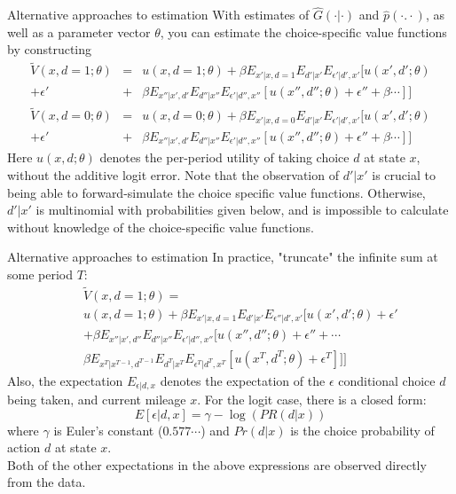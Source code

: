 \documentclass[xcolor=pdftex,dvipsnames,table,mathserif]{beamer}
\begin{document}
\begin{frame}{Alternative approaches to estimation}
With estimates of $\hat G (\cdot | \cdot)$ and $\hat p (\cdot .  \cdot)$, as well as a parameter vector $\theta$, you can \alert{estimate} the choice-specific value functions by constructing  
\begin{eqnarray*}
\tilde V(x, d =1 ;\theta) &= & u(x, d=1; \theta) + \beta E_{x'|x, d=1} E_{d'|x'} E_{\epsilon '| d', x'} [ u(x', d' ;\theta)\\ 
+ \epsilon' &+&  \beta E_{x''|x', d'} E_{d''|x''} E_{\epsilon'|d'', x''} [ u(x'', d'';\theta) + \epsilon'' + \beta \cdots ] ] \\
\tilde V(x, d =0 ;\theta) &= & u(x, d=0; \theta) + \beta E_{x'|x, d=0} E_{d'|x'} E_{\epsilon '| d', x'} [ u(x', d' ;\theta)  \\
+ \epsilon' &+& \beta E_{x''|x', d'} E_{d''|x''} E_{\epsilon'|d'', x''} [ u(x'', d'';\theta) + \epsilon'' + \beta \cdots ] ]
\end{eqnarray*}
Here $u(x, d;\theta)$ denotes the per-period utility of taking choice $d$ at state $x$, \alert{without} the additive logit error. Note that the observation of $d'|x'$ is crucial to being able to forward-simulate the \alert{choice specific value functions}. Otherwise, $d'|x'$ is multinomial with probabilities given below, and is impossible to calculate without knowledge of the choice-specific value functions. 
\end{frame}


\begin{frame}{Alternative approaches to estimation}
In practice, "truncate" the infinite sum at some period $T$: 
\begin{eqnarray*} 
&& \tilde V(x, d=1;\theta) =\\
&& u(x, d=1; \theta) + \beta E_{x'|x, d=1} E_{d'|x'} E_{\epsilon''|d', x'} [u(x', d';\theta) + \epsilon' \\
&& + \beta E_{x''|x', d''} E_{d''|x''} E_{\epsilon'|d'', x''} [u(x'', d'';\theta) + \epsilon'' + \cdots \\
&& \beta E_{x^T|x^{T-1}, d^{T-1}} E_{d^T|x^T} E_{\epsilon^T|d^T, x^T} [u(x^T, d^T;\theta) + \epsilon^T ]]]
\end{eqnarray*}
Also, the expectation $E_{\epsilon|d, x}$ denotes the expectation of the $\epsilon$ conditional choice $d$ being taken, and current mileage $x$. For the logit case, there is a closed form:
$$ E[\epsilon | d, x] = \gamma - \log(PR(d|x))$$
where $\gamma$ is Euler's constant ($0.577\cdots$) and $Pr(d|x)$ is the choice probability of action $d$ at state $x$. \\
\vspace{2mm}
Both of the other expectations in the above expressions are observed directly from the data. 
\end{frame}
\end{document}
